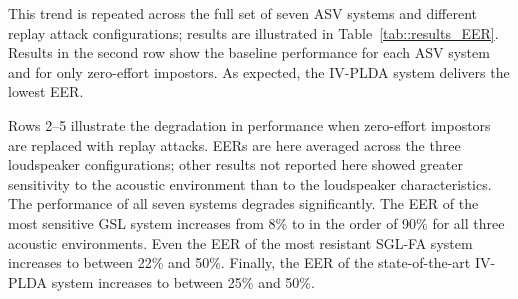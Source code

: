 This trend is repeated across the full set of seven ASV systems and different replay attack configurations;  
results are illustrated in Table~\ref{tab::results_EER}.
Results in the second row show the baseline performance for each ASV system and for only zero-effort impostors.
As expected, the IV-PLDA system delivers the lowest EER.

Rows 2--5 illustrate the degradation in performance when zero-effort impostors are replaced with replay attacks.
EERs are here averaged across the three loudspeaker configurations; other results not reported here showed greater sensitivity to the acoustic environment than to the loudspeaker characteristics.  
The performance of all seven systems degrades significantly.
The EER of the most sensitive GSL system increases from 8\% to in the order of 90\% for all three acoustic environments.
Even the EER of the most resistant SGL-FA system increases to between 22\% and 50\%.  
Finally, the EER of the state-of-the-art IV-PLDA system increases to between 25\% and 50\%.  






